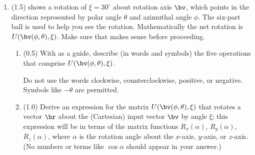 \documentclass[11pt,titlepage,fleqn]{article}
\newcommand{\rotangA}{\alpha}
\newcommand{\rotangB}{\xi}    %
\newcommand{\rotvec}{\bv}      %
\newcommand{\Rmat}{R}
\newcommand{\Umat}{U}
\begin{document}
\begin{enumerate}
\begin{enumerate}
\item (0.2) Show your code.

\item (0.3) List the computer output for $\Rmat_x(60^\circ)$, $\Rmat_y(60^\circ)$, and $\Rmat_z(60^\circ)$.
\end{enumerate}

\item (1.5)  shows a rotation of $\rotangB = 30^\circ$ about rotation axis $\rotvec$, which points in the direction represented by polar angle $\theta$ and azimuthal angle $\phi$. The six-part ball is used to help you see the rotation. Mathematically the net rotation is $\Umat(\rotvec(\phi,\theta),\rotangB)$. Make sure that  makes sense before proceeding.
%
\begin{enumerate}
\item (0.5) With  as a guide, describe (in words and symbols) the five operations that comprise $\Umat(\rotvec(\phi,\theta),\rotangB)$.

Do not use the words clockwise, counterclockwise, positive, or negative. Symbols like $-\theta$ are permitted.

\item (1.0) Derive an expression for the matrix $\Umat(\rotvec(\phi,\theta),\rotangB)$ that rotates a vector $\br$ about the (Cartesian) input vector $\rotvec$ by angle $\rotangB$; this expression will be in terms of the matrix functions $\Rmat_x(\rotangA)$, $\Rmat_y(\rotangA)$, $\Rmat_z(\rotangA)$, where $\rotangA$ is the rotation angle about the $x$-axis, $y$-axis, or $z$-axis. (No numbers or terms like $\cos\rotangA$ should appear in your answer.)

\end{enumerate}


\end{enumerate}
\end{document}
